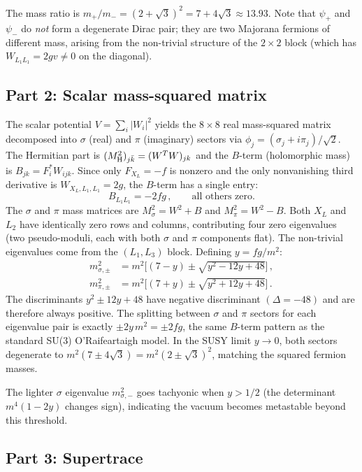 \documentclass[12pt]{article}
\begin{document}
\medskip\noindent
The mass ratio is $m_+/m_- = (2+\sqrt{3})^2 = 7+4\sqrt{3} \approx 13.93$. Note that $\psi_+$ and $\psi_-$ do \emph{not} form a degenerate Dirac pair; they are two Majorana fermions of different mass, arising from the non-trivial structure of the $2\times 2$ block (which has $W_{L_1L_1} = 2gv \neq 0$ on the diagonal).

\subsection*{Part 2: Scalar mass-squared matrix}

The scalar potential $V = \sum_i |W_i|^2$ yields the $8\times 8$ real mass-squared matrix decomposed into $\sigma$ (real) and $\pi$ (imaginary) sectors via $\phi_j = (\sigma_j + i\pi_j)/\sqrt{2}$. The Hermitian part is $(M^2_{\rm H})_{j\bar k} = (W^TW)_{jk}$ and the $B$-term (holomorphic mass) is $B_{jk} = F_i^* W_{ijk}$. Since only $F_{X_L} = -f$ is nonzero and the only nonvanishing third derivative is $W_{X_L,L_1,L_1} = 2g$, the $B$-term has a single entry:
$$
B_{L_1 L_1} = -2fg\,,\qquad \text{all others zero.}
$$
The $\sigma$ and $\pi$ mass matrices are $M^2_\sigma = W^2 + B$ and $M^2_\pi = W^2 - B$. Both $X_L$ and $L_2$ have identically zero rows and columns, contributing four zero eigenvalues (two pseudo-moduli, each with both $\sigma$ and $\pi$ components flat). The non-trivial eigenvalues come from the $(L_1,L_3)$ block. Defining $y = fg/m^2$:
\begin{align*}
m^2_{\sigma,\pm} &= m^2\bigl[(7-y) \pm \sqrt{y^2 - 12y + 48}\bigr]\,,\\
m^2_{\pi,\pm} &= m^2\bigl[(7+y) \pm \sqrt{y^2 + 12y + 48}\bigr]\,.
\end{align*}
The discriminants $y^2 \pm 12y + 48$ have negative discriminant $(\Delta = -48)$ and are therefore always positive. The splitting between $\sigma$ and $\pi$ sectors for each eigenvalue pair is exactly $\pm 2y\,m^2 = \pm 2fg$, the same $B$-term pattern as the standard SU(3) O'Raifeartaigh model. In the SUSY limit $y\to 0$, both sectors degenerate to $m^2(7\pm 4\sqrt{3}) = m^2(2\pm\sqrt{3})^2$, matching the squared fermion masses.

The lighter $\sigma$ eigenvalue $m^2_{\sigma,-}$ goes tachyonic when $y > 1/2$ (the determinant $m^4(1-2y)$ changes sign), indicating the vacuum becomes metastable beyond this threshold.

\subsection*{Part 3: Supertrace}
\end{document}
